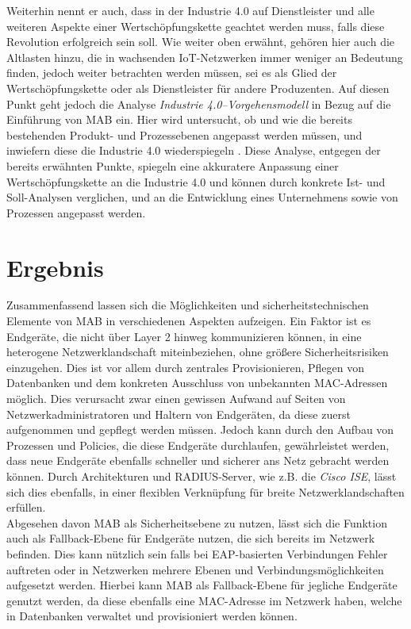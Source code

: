 \documentclass[conference]{IEEEtran}
\begin{document}
Weiterhin nennt er auch, dass in der Industrie 4.0 auf Dienstleister und alle weiteren Aspekte einer Wertschöpfungskette geachtet werden muss, falls diese Revolution erfolgreich sein soll. Wie weiter oben erwähnt, gehören hier auch die Altlasten hinzu, die in wachsenden IoT-Netzwerken immer weniger an Bedeutung finden, jedoch weiter betrachten werden müssen, sei es als Glied der Wertschöpfungskette oder als Dienstleister für andere Produzenten. Auf diesen Punkt geht jedoch die Analyse \emph{Industrie 4.0–Vorgehensmodell} in Bezug auf die Einführung von MAB ein. Hier wird untersucht, ob und wie die bereits bestehenden Produkt- und Prozessebenen angepasst werden müssen, und inwiefern diese die Industrie 4.0 wiederspiegeln \cite{lucia2016industrie}. Diese Analyse, entgegen der bereits erwähnten Punkte, spiegeln eine akkuratere Anpassung einer Wertschöpfungskette an die Industrie 4.0 und können durch konkrete Ist- und Soll-Analysen verglichen, und an die Entwicklung eines Unternehmens sowie von Prozessen angepasst werden.\\

%

\vspace{1em}
\section{Ergebnis}
Zusammenfassend lassen sich die Möglichkeiten und sicherheitstechnischen Elemente von MAB in verschiedenen Aspekten aufzeigen. Ein Faktor ist es Endgeräte, die nicht über Layer 2 hinweg kommunizieren können, in eine heterogene Netzwerklandschaft miteinbeziehen, ohne größere Sicherheitsrisiken einzugehen. Dies ist vor allem durch zentrales Provisionieren, Pflegen von Datenbanken und dem konkreten Ausschluss von unbekannten MAC-Adressen möglich. Dies verursacht zwar einen gewissen Aufwand auf Seiten von Netzwerkadministratoren und Haltern von Endgeräten, da diese zuerst aufgenommen und gepflegt werden müssen. Jedoch kann durch den Aufbau von Prozessen und Policies, die diese Endgeräte durchlaufen, gewährleistet werden, dass neue Endgeräte ebenfalls schneller und sicherer ans Netz gebracht werden können. Durch Architekturen und RADIUS-Server, wie z.B. die \emph{Cisco ISE}, lässt sich dies ebenfalls, in einer flexiblen Verknüpfung für breite Netzwerklandschaften erfüllen.\\

Abgesehen davon MAB als Sicherheitsebene zu nutzen, lässt sich die Funktion auch als Fallback-Ebene für Endgeräte nutzen, die sich bereits im Netzwerk befinden. Dies kann nützlich sein falls bei EAP-basierten Verbindungen Fehler auftreten oder in Netzwerken mehrere Ebenen und Verbindungsmöglichkeiten aufgesetzt werden. Hierbei kann MAB als Fallback-Ebene für jegliche Endgeräte genutzt werden, da diese ebenfalls eine MAC-Adresse im Netzwerk haben, welche in Datenbanken verwaltet und provisioniert werden können.\\
\end{document}
